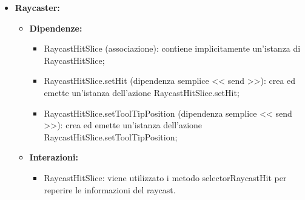\begin{itemize}
    \item \textbf{Raycaster:}
    \begin{itemize}
        \item \textbf{Dipendenze:}
        \begin{itemize}
            \item RaycastHitSlice (associazione):  contiene implicitamente un'istanza di RaycastHitSlice;
            \item RaycastHitSlice.setHit (dipendenza semplice << send >>):  crea ed emette un’istanza dell’azione RaycastHitSlice.setHit;
            \item RaycastHitSlice.setToolTipPosition (dipendenza semplice << send >>):  crea ed emette un’istanza dell’azione RaycastHitSlice.setToolTipPosition;
        \end{itemize} 
        \item \textbf{Interazioni:}
        \begin{itemize}
            \item RaycastHitSlice: viene utilizzato i metodo selectorRaycastHit per reperire le informazioni del raycast.
        \end{itemize}  
    \end{itemize}
\end{itemize}

